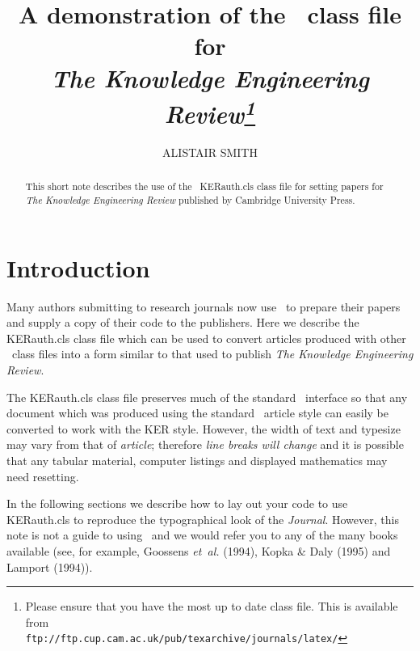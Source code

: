 \documentclass{KERauth}
\begin{document}



\title{A demonstration of the \LaTeXe\
class file for\\ \itshape{The Knowledge Engineering
Review}\footnote{Please ensure that you have the most up to date
class file. This is available from\\
\texttt{ftp://ftp.cup.cam.ac.uk/pub/texarchive/journals/latex/}}}

\author{ALISTAIR SMITH}

\address{Sunrise Setting Ltd, 12a Fore Street, St.~Marychurch,
Torquay, Devon, TQ1~4NE, UK\\
}

\begin{abstract}
This short note describes the use of the \LaTeXe\ \textsf{KERauth.cls}
class file for setting papers for \emph{The Knowledge Engineering
Review} published by Cambridge University Press.
\end{abstract}

\section{Introduction}
Many authors submitting to research journals now use \LaTeXe\ to
prepare their papers and supply a copy of their code to the
publishers. Here we describe the \textsf{KERauth.cls} class file
which can be used to convert articles produced with other \LaTeXe\
class files into a form similar to that used to publish
\emph{The Knowledge Engineering Review}.

The \textsf{KERauth.cls} class file preserves much of the standard
\LaTeXe\ interface so that any document which was produced using
the standard \LaTeXe\ \textsf{article} style can easily be
converted to work with the \textsf{KER} style. However, the width
of text and typesize may vary from that of \emph{article};
therefore \emph{line breaks will change} and it is possible that
any tabular material, computer listings and displayed mathematics
may need resetting.

In the following sections we describe how to lay out your code to
use \textsf{KERauth.cls} to reproduce the typographical look of the
\emph{Journal}. However, this note is not a guide to using
\LaTeXe\ and we would refer you to any of the many books available
(see, for example, Goossens \emph{et~al.} (1994), Kopka
\& Daly (1995) and Lamport (1994)).
\end{document}
